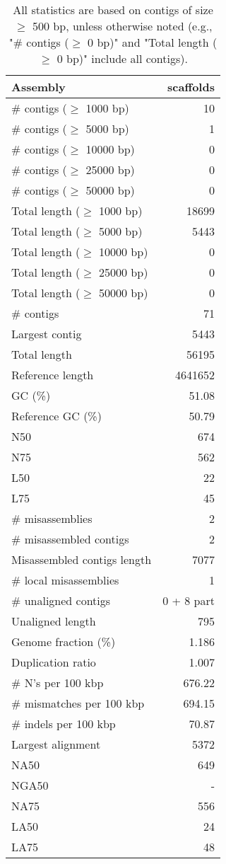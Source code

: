 \documentclass[12pt,a4paper]{article}
\begin{document}
\begin{table}[ht]
\begin{center}
\caption{All statistics are based on contigs of size $\geq$ 500 bp, unless otherwise noted (e.g., "\# contigs ($\geq$ 0 bp)" and "Total length ($\geq$ 0 bp)" include all contigs).}
\begin{tabular}{|l*{1}{|r}|}
\hline
Assembly & scaffolds \\ \hline
\# contigs ($\geq$ 1000 bp) & 10 \\ \hline
\# contigs ($\geq$ 5000 bp) & 1 \\ \hline
\# contigs ($\geq$ 10000 bp) & 0 \\ \hline
\# contigs ($\geq$ 25000 bp) & 0 \\ \hline
\# contigs ($\geq$ 50000 bp) & 0 \\ \hline
Total length ($\geq$ 1000 bp) & 18699 \\ \hline
Total length ($\geq$ 5000 bp) & 5443 \\ \hline
Total length ($\geq$ 10000 bp) & 0 \\ \hline
Total length ($\geq$ 25000 bp) & 0 \\ \hline
Total length ($\geq$ 50000 bp) & 0 \\ \hline
\# contigs & 71 \\ \hline
Largest contig & 5443 \\ \hline
Total length & 56195 \\ \hline
Reference length & 4641652 \\ \hline
GC (\%) & 51.08 \\ \hline
Reference GC (\%) & 50.79 \\ \hline
N50 & 674 \\ \hline
N75 & 562 \\ \hline
L50 & 22 \\ \hline
L75 & 45 \\ \hline
\# misassemblies & 2 \\ \hline
\# misassembled contigs & 2 \\ \hline
Misassembled contigs length & 7077 \\ \hline
\# local misassemblies & 1 \\ \hline
\# unaligned contigs & 0 + 8 part \\ \hline
Unaligned length & 795 \\ \hline
Genome fraction (\%) & 1.186 \\ \hline
Duplication ratio & 1.007 \\ \hline
\# N's per 100 kbp & 676.22 \\ \hline
\# mismatches per 100 kbp & 694.15 \\ \hline
\# indels per 100 kbp & 70.87 \\ \hline
Largest alignment & 5372 \\ \hline
NA50 & 649 \\ \hline
NGA50 & - \\ \hline
NA75 & 556 \\ \hline
LA50 & 24 \\ \hline
LA75 & 48 \\ \hline
\end{tabular}
\end{center}
\end{table}
\end{document}
